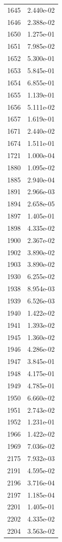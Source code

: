 \documentclass[12pt]{article}
\begin{document}
\begin{longtable}{@{}cc@{}}
1645 & 2.440e-02 \\
1646 & 2.388e-02 \\
1650 & 1.275e-01 \\
1651 & 7.985e-02 \\
1652 & 5.300e-01 \\
1653 & 5.845e-01 \\
1654 & 6.855e-01 \\
1655 & 1.139e-01 \\
1656 & 5.111e-02 \\
1657 & 1.619e-01 \\
1671 & 2.440e-02 \\
1674 & 1.511e-01 \\
1721 & 1.000e-04 \\
1880 & 1.095e-02 \\
1885 & 2.940e-04 \\
1891 & 2.966e-03 \\
1894 & 2.658e-05 \\
1897 & 1.405e-01 \\
1898 & 4.335e-02 \\
1900 & 2.367e-02 \\
1902 & 3.890e-02 \\
1903 & 3.890e-02 \\
1930 & 6.255e-02 \\
1938 & 8.954e-03 \\
1939 & 6.526e-03 \\
1940 & 1.422e-02 \\
1941 & 1.393e-02 \\
1945 & 1.360e-02 \\
1946 & 4.286e-02 \\
1947 & 3.845e-01 \\
1948 & 4.175e-01 \\
1949 & 4.785e-01 \\
1950 & 6.660e-02 \\
1951 & 2.743e-02 \\
1952 & 1.231e-01 \\
1966 & 1.422e-02 \\
1969 & 7.036e-02 \\
2175 & 7.932e-03 \\
2191 & 4.595e-02 \\
2196 & 3.716e-04 \\
2197 & 1.185e-04 \\
2201 & 1.405e-01 \\
2202 & 4.335e-02 \\
2204 & 3.563e-02 \\

\end{longtable}
\end{document}
